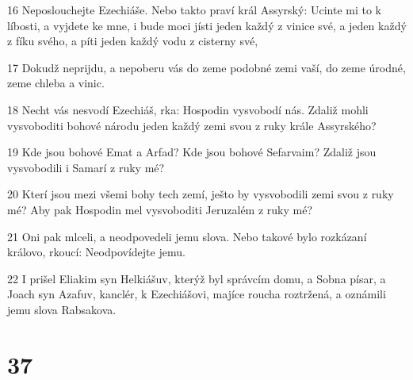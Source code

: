 \par 16 Neposlouchejte Ezechiáše. Nebo takto praví král Assyrský: Ucinte mi to k líbosti, a vyjdete ke mne, i bude moci jísti jeden každý z vinice své, a jeden každý z fíku svého, a píti jeden každý vodu z cisterny své,
\par 17 Dokudž neprijdu, a nepoberu vás do zeme podobné zemi vaší, do zeme úrodné, zeme chleba a vinic.
\par 18 Necht vás nesvodí Ezechiáš, rka: Hospodin vysvobodí nás. Zdaliž mohli vysvoboditi bohové národu jeden každý zemi svou z ruky krále Assyrského?
\par 19 Kde jsou bohové Emat a Arfad? Kde jsou bohové Sefarvaim? Zdaliž jsou vysvobodili i Samarí z ruky mé?
\par 20 Kterí jsou mezi všemi bohy tech zemí, ješto by vysvobodili zemi svou z ruky mé? Aby pak Hospodin mel vysvoboditi Jeruzalém z ruky mé?
\par 21 Oni pak mlceli, a neodpovedeli jemu slova. Nebo takové bylo rozkázaní královo, rkoucí: Neodpovídejte jemu.
\par 22 I prišel Eliakim syn Helkiášuv, kterýž byl správcím domu, a Sobna písar, a Joach syn Azafuv, kanclér, k Ezechiášovi, majíce roucha roztržená, a oznámili jemu slova Rabsakova.

\chapter{37}

